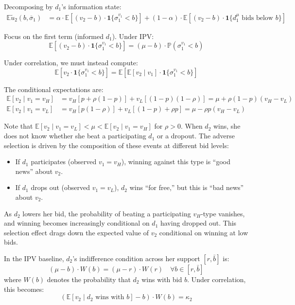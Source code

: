 \documentclass[11pt]{article}
\theoremstyle{plain}
\theoremstyle{definition}
\theoremstyle{plain}
\theoremstyle{plain}
\theoremstyle{plain}
\theoremstyle{plain}
\numberwithin{equation}{section}
\begin{document}
\noindent Decomposing by $d_1$'s information state:
\begin{align*}
    \mathbb{E}\tilde{u}_2(b,\overline{\sigma}_1) &= \alpha \cdot \mathbb{E}\left[ (v_2 - b) \cdot \mathbf{1}\{\sigma_1^{v_1} < b\} \right] + (1 - \alpha) \cdot \mathbb{E}\left[ (v_2 - b) \cdot \mathbf{1}\{d_1^\mu \text{ bids below } b\} \right]
\end{align*}

\noindent Focus on the first term (informed $d_1$). Under IPV:
\[
\mathbb{E}\left[ (v_2 - b) \cdot \mathbf{1}\{\sigma_1^{v_1} < b\} \right] = (\mu - b) \cdot \mathbb{P}(\sigma_1^{v_1} < b)
\]

\noindent Under correlation, we must instead compute:
\[
\mathbb{E}\left[ v_2 \cdot \mathbf{1}\{\sigma_1^{v_1} < b\} \right] = \mathbb{E}\left[ \mathbb{E}[v_2 \mid v_1] \cdot \mathbf{1}\{\sigma_1^{v_1} < b\} \right]
\]

\noindent The conditional expectations are:
\begin{align*}
    \mathbb{E}[v_2 \mid v_1 = v_H] &= v_H [p + \rho(1-p)] + v_L [(1-p)(1-\rho)] = \mu + \rho(1-p)(v_H - v_L) \\
    \mathbb{E}[v_2 \mid v_1 = v_L] &= v_H [p(1-\rho)] + v_L [(1-p) + \rho p] = \mu - \rho p (v_H - v_L)
\end{align*}

\noindent Note that $\mathbb{E}[v_2 \mid v_1 = v_L] < \mu < \mathbb{E}[v_2 \mid v_1 = v_H]$ for $\rho > 0$. When $d_2$ wins, she does not know whether she beat a participating $d_1$ or a dropout. The adverse selection is driven by the composition of these events at different bid levels:
\begin{itemize}
    \item If $d_1$ participates (observed $v_1 = v_H$), winning against this type is ``good news'' about $v_2$.
    \item If $d_1$ drops out (observed $v_1 = v_L$), $d_2$ wins ``for free,'' but this is ``bad news'' about $v_2$.
\end{itemize}
As $d_2$ lowers her bid, the probability of beating a participating $v_H$-type vanishes, and winning becomes increasingly conditional on $d_1$ having dropped out. This selection effect drags down the expected value of $v_2$ conditional on winning at low bids.

\vspace{0.3cm}

\noindent In the IPV baseline, $d_2$'s indifference condition across her support $[r, \bar{b}]$ is:
\[
(\mu - b) \cdot W(b) = (\mu - r) \cdot W(r) \quad \forall b \in [r, \bar{b}]
\]
where $W(b)$ denotes the probability that $d_2$ wins with bid $b$. Under correlation, this becomes:
\[
\left( \mathbb{E}[v_2 \mid d_2 \text{ wins with } b] - b \right) \cdot W(b) = \kappa_2
\]
\end{document}
